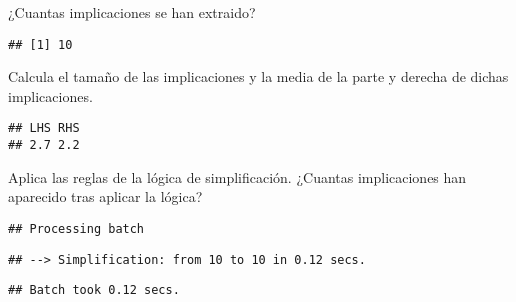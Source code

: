 \documentclass[
]{book}
\newenvironment{Shaded}{\begin{snugshade}}{\end{snugshade}}
\newcommand{\AttributeTok}[1]{\textcolor[rgb]{0.77,0.63,0.00}{#1}}
\newcommand{\FunctionTok}[1]{\textcolor[rgb]{0.00,0.00,0.00}{#1}}
\newcommand{\NormalTok}[1]{#1}
\newcommand{\OtherTok}[1]{\textcolor[rgb]{0.56,0.35,0.01}{#1}}
\newcommand{\SpecialCharTok}[1]{\textcolor[rgb]{0.00,0.00,0.00}{#1}}
\newcommand{\StringTok}[1]{\textcolor[rgb]{0.31,0.60,0.02}{#1}}
\begin{document}
¿Cuantas implicaciones se han extraido?

\begin{Shaded}
\end{Shaded}

\begin{verbatim}
## [1] 10
\end{verbatim}

Calcula el tamaño de las implicaciones y la media de la parte y derecha de dichas implicaciones.

\begin{Shaded}
\end{Shaded}

\begin{verbatim}
## LHS RHS 
## 2.7 2.2
\end{verbatim}

Aplica las reglas de la lógica de simplificación. ¿Cuantas implicaciones han aparecido tras aplicar la lógica?

\begin{Shaded}
\end{Shaded}

\begin{verbatim}
## Processing batch
\end{verbatim}

\begin{verbatim}
## --> Simplification: from 10 to 10 in 0.12 secs.
\end{verbatim}

\begin{verbatim}
## Batch took 0.12 secs.
\end{verbatim}

\begin{Shaded}
\end{Shaded}
\end{document}
